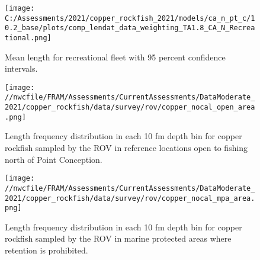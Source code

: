 \documentclass[11pt,
  english,
  a4paper,
]{article}
\begin{document}
\begin{figure}
\centering
\texttt{[image: C:/Assessments/2021/copper\_rockfish\_2021/models/ca\_n\_pt\_c/10.2\_base/plots/comp\_lendat\_data\_weighting\_TA1.8\_CA\_N\_Recreational.png]}
\caption{Mean length for recreational fleet with 95 percent confidence intervals.\label{fig:mean-rec-len-data}}
\end{figure}

\tagmcend\tagstructend


\begin{figure}
\centering
\texttt{[image: //nwcfile/FRAM/Assessments/CurrentAssessments/DataModerate\_2021/copper\_rockfish/data/survey/rov/copper\_nocal\_open\_area.png]}
\caption{Length frequency distribution in each 10 fm depth bin for copper rockfish sampled by the ROV in reference locations open to fishing north of Point Conception.\label{fig:rov-open}}
\end{figure}

\tagmcend\tagstructend

\clearpage


\begin{figure}
\centering
\texttt{[image: //nwcfile/FRAM/Assessments/CurrentAssessments/DataModerate\_2021/copper\_rockfish/data/survey/rov/copper\_nocal\_mpa\_area.png]}
\caption{Length frequency distribution in each 10 fm depth bin for copper rockfish sampled by the ROV in marine protected areas where retention is prohibited.\label{fig:rov-mpa}}
\end{figure}

\tagmcend\tagstructend

\clearpage

\end{document}
